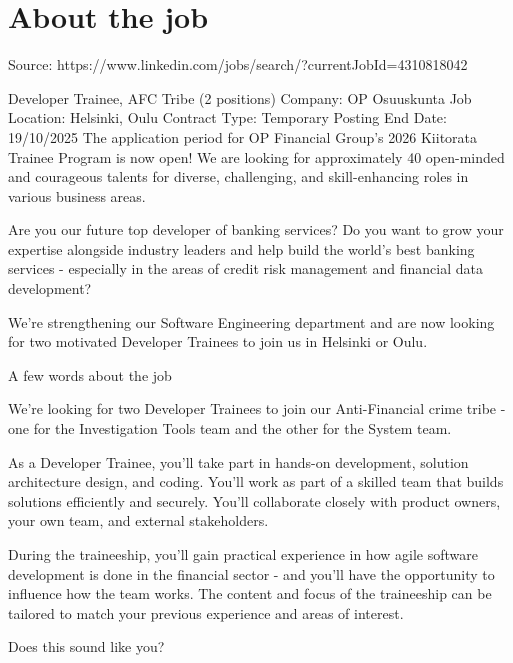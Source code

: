 \documentclass[a4paper,11pt]{article}
\begin{document}
	
	

	\section{About the job}

Source: https://www.linkedin.com/jobs/search/?currentJobId=4310818042

Developer Trainee, AFC Tribe (2 positions)
Company:  OP Osuuskunta
Job Location:  Helsinki, Oulu
Contract Type:  Temporary
Posting End Date:  19/10/2025
The application period for OP Financial Group's 2026 Kiitorata Trainee Program is now open! We are looking for approximately 40 open-minded and courageous talents for diverse, challenging, and skill-enhancing roles in various business areas.

Are you our future top developer of banking services? Do you want to grow your expertise alongside industry leaders and help build the world's best banking services - especially in the areas of credit risk management and financial data development?

We're strengthening our Software Engineering department and are now looking for two motivated Developer Trainees to join us in Helsinki or Oulu.

A few words about the job

We're looking for two Developer Trainees to join our Anti-Financial crime tribe - one for the Investigation Tools team and the other for the System team.

As a Developer Trainee, you'll take part in hands-on development, solution architecture design, and coding. You'll work as part of a skilled team that builds solutions efficiently and securely. You'll collaborate closely with product owners, your own team, and external stakeholders.

During the traineeship, you'll gain practical experience in how agile software development is done in the financial sector - and you'll have the opportunity to influence how the team works. The content and focus of the traineeship can be tailored to match your previous experience and areas of interest.

Does this sound like you?
\end{document}
